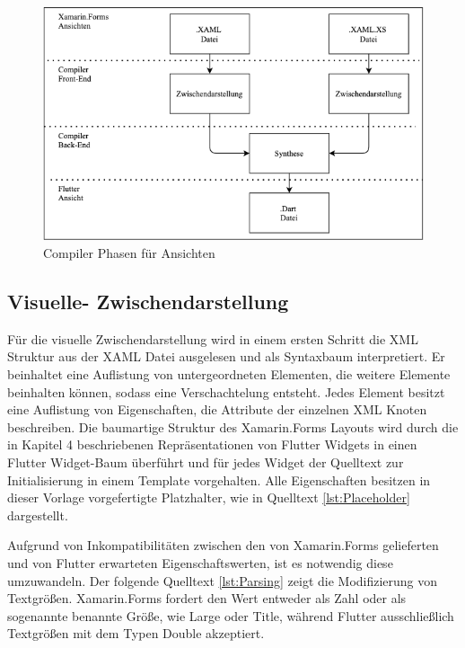 \begin{figure}[!ht]
 \includegraphics[width=\textwidth,keepaspectratio]{Images/Implementation/ViewCompiler.png}
 \caption{Compiler Phasen für Ansichten}
 \label{fig:ViewCompilerPhases}
\end{figure}

\subsection{Visuelle- Zwischendarstellung}

Für die visuelle Zwischendarstellung wird in einem ersten Schritt die XML Struktur
aus der XAML Datei ausgelesen und als Syntaxbaum interpretiert.  Er beinhaltet eine Auflistung von untergeordneten Elementen,  die weitere Elemente beinhalten können,  sodass eine Verschachtelung  entsteht.  Jedes Element besitzt eine Auflistung von Eigenschaften, die Attribute der einzelnen XML Knoten beschreiben.  Die baumartige Struktur des Xamarin.Forms Layouts wird durch die in Kapitel 4 beschriebenen Repräsentationen von Flutter Widgets in einen Flutter Widget-Baum überführt und für jedes Widget der Quelltext zur Initialisierung in einem Template vorgehalten.  Alle Eigenschaften besitzen in dieser Vorlage vorgefertigte Platzhalter, wie in Quelltext \ref{lst:Placeholder} dargestellt.

 

Aufgrund von Inkompatibilitäten zwischen den von Xamarin.Forms gelieferten und von Flutter erwarteten Eigenschaftswerten, ist es notwendig diese umzuwandeln.  Der folgende Quelltext \ref{lst:Parsing} zeigt die Modifizierung von Textgrößen.  Xamarin.Forms fordert den Wert entweder als Zahl oder als sogenannte benannte Größe,  wie \glq Large\grq{} oder \glq Title\grq , während Flutter ausschließlich Textgrößen mit dem Typen Double akzeptiert.   

